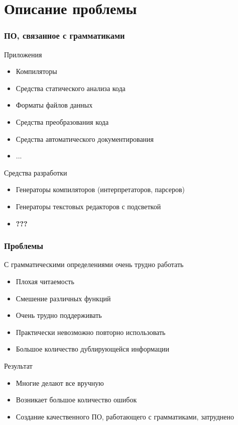 \documentclass[paper=screen,10pt,unicode]{beamer}
\begin{document}
\section{Описание проблемы}
\begin{frame}
	\frametitle{ПО, связанное с грамматиками}
	\begin{block}{Приложения}
		\begin{itemize}
			\item Компиляторы
			\item Средства статического анализа кода
			\item Форматы файлов данных
			\item Средства преобразования кода
			\item Средства автоматического документирования
			\item ...
		\end{itemize}
	\end{block}
	\begin{block}{Средства разработки}
		\begin{itemize}
			\item Генераторы компиляторов (интерпретаторов, парсеров)
			\item Генераторы текстовых редакторов с подсветкой
			\item \large \bf\alert{???}
		\end{itemize}
	\end{block}
\end{frame}

\begin{frame}
	\frametitle{Проблемы}

	\begin{block}{С грамматическими определениями очень трудно работать}
		\begin{itemize}
			\item Плохая читаемость
			\item Смешение различных функций
			\item Очень трудно поддерживать
			\item Практически невозможно повторно использовать
			\item Большое количество дублирующейся информации
		\end{itemize}
	\end{block}
	\begin{block}{Результат}
		\begin{itemize}
			\item Многие делают все вручную
			\item Возникает большое количество ошибок
			\item Создание качественного ПО, работающего с грамматиками, затруднено
		\end{itemize}
	\end{block}
\end{frame}
\end{document}
